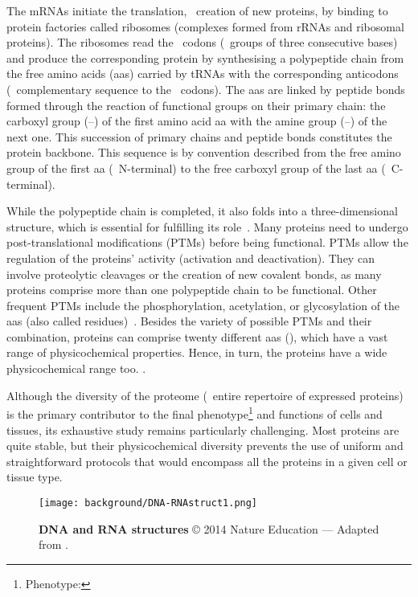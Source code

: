 The \glspl{mRNA} initiate the translation,
\ie\ creation of new proteins,
by binding to protein factories called ribosomes
(complexes formed from \glspl{rRNA} and ribosomal proteins).
The ribosomes read the \mRNA\ codons (\ie\ groups of three consecutive bases)
and produce the corresponding protein by synthesising a polypeptide chain
from the free amino acids (\glspl{aa}) carried by \glspl{tRNA}
with the corresponding anticodons (\ie\ complementary sequence to the \mRNA\ codons).
The \glspl{aa} are linked by peptide bonds formed
through the reaction of functional groups on their primary chain:
the carboxyl group (--) of the first amino acid \gls{aa}
with the amine group (--) of the next one.
This succession of primary chains and peptide bonds constitutes
the protein backbone.
This sequence is by convention described
from the free amino group of the first \gls{aa} (\ie\ N-terminal)
to the free carboxyl group of the last \gls{aa} (\ie\ C-terminal).\mybr\

While the polypeptide chain is completed,
it also folds into a three-dimensional structure,
which is essential for fulfilling its role~.
Many proteins need to undergo post-translational modifications (\glspl{PTM})
before being functional.
\glspl{PTM} allow the regulation of the proteins' activity
(activation and deactivation).
They can involve proteolytic cleavages or the creation of new covalent bonds,
as many proteins comprise more than one polypeptide chain to be functional.
Other frequent \glspl{PTM} include the phosphorylation, acetylation,
or glycosylation of the \glspl{aa} (also called residues)~.
Besides the variety of possible \glspl{PTM} and their combination,
proteins can comprise twenty different \glspl{aa} (),
which have a vast range of physicochemical properties.
Hence, in turn, the proteins have a wide physicochemical range too.
.\mybr\

Although the diversity of the proteome
(\ie\ entire repertoire of expressed proteins)
is the primary contributor to
the final \gls{phenotype}\footnote{Phenotype: }
and functions of cells and tissues,
its exhaustive study remains particularly challenging.
Most proteins are quite stable,
but their physicochemical diversity prevents
the use of uniform and straightforward protocols
that would encompass all the proteins
in a given cell or tissue type.~\mybr\

\begin{figure}[!htbp]
    \texttt{[image: background/DNA-RNAstruct1.png]}\centering
    \vspace{-2mm}
    \caption[DNA and RNA structures]{\label{fig:DNARNAstruct}%
    \textbf{DNA and RNA structures} © 2014 Nature Education ---
    Adapted from \citet{Pierce2005-ib}.}
\end{figure}

